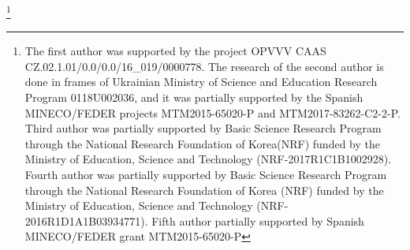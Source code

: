 \documentclass[a4paper,10pt]{amsart}
\theoremstyle{plain}
\theoremstyle{definition}
\begin{document}
\begin{abstract}
We study approximation of operators between Banach spaces $X$ and $Y$ that nearly attain their norms in a given point by operators that attain their norms at the same point. When such approximations exist, we say that the pair $(X, Y)$  has the  pointwise Bishop-Phelps-Bollob\'as property (pointwise BPB property for short). In this paper we mostly concentrate on those $X$, called universal pointwise BPB domain spaces, such that $(X, Y)$ possesses pointwise BPB property for every $Y$, and on those $Y$, called universal pointwise BPB range spaces, such that $(X, Y)$ enjoys pointwise BPB property for every uniformly smooth $X$. We show that every universal pointwise BPB domain space is uniformly convex and that $L_p(\mu)$ spaces fail to have this property when $p>2$. For universal pointwise BPB range space, we show that every simultaneously uniformly convex and uniformly smooth Banach space fails it if its dimension is greater than one. We also discuss a version of the pointwise BPB property for compact operators.
\end{abstract}


\date{September 18th, 2017. Revised June 28th, 2018.}

\thanks{The first author was supported by the project OPVVV CAAS CZ.02.1.01/0.0/0.0/16\_019/0000778. The research of the second author is done in frames of Ukrainian Ministry of Science and Education Research Program 0118U002036, and it was partially supported by the Spanish MINECO/FEDER projects MTM2015-65020-P and MTM2017-83262-C2-2-P. Third author was partially supported by Basic Science Research Program through the National Research Foundation of Korea(NRF) funded by the Ministry of Education, Science and Technology (NRF-2017R1C1B1002928). Fourth author was partially supported by Basic Science Research Program through the National Research Foundation of Korea (NRF) funded by the Ministry of Education, Science and Technology (NRF-2016R1D1A1B03934771). Fifth author partially supported by Spanish MINECO/FEDER grant MTM2015-65020-P}



\maketitle

\thispagestyle{plain}
\end{document}
